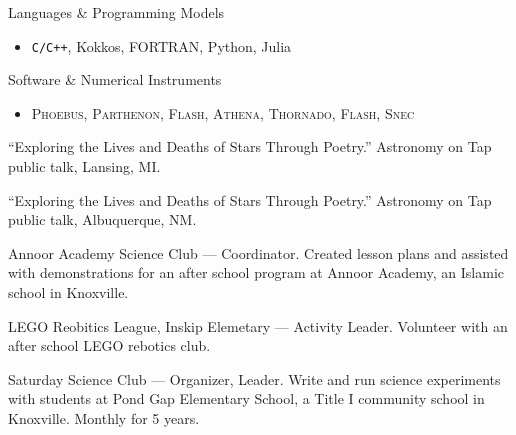 \documentclass[11pt]{vitae}
\begin{document}
\begin{genericlist}
\item[] Languages \& Programming Models
\begin{itemize}
  \item[] \texttt{C/C++}, Kokkos, FORTRAN, Python, Julia
\end{itemize}
\item[] Software \& Numerical Instruments
\begin{itemize}
 \item[] \textsc{Phoebus}, \textsc{Parthenon}, \textsc{Flash}, \textsc{Athena}, \textsc{Thornado}, \textsc{Flash}, \textsc{Snec}
\end{itemize}
\end{genericlist}

%
%
%
%


\begin{genericlist}

\item ``Exploring the Lives and Deaths of Stars Through Poetry.'' Astronomy on Tap public talk, Lansing, MI.

\item ``Exploring the Lives and Deaths of Stars Through Poetry.'' Astronomy on Tap public talk, Albuquerque, NM.

\item Annoor Academy Science Club --- Coordinator. Created lesson plans and assisted with demonstrations for an after school program at Annoor Academy, an Islamic school in Knoxville.

\item LEGO Reobitics League, Inskip Elemetary --- Activity Leader. Volunteer with an after school LEGO rebotics club.

\item Saturday Science Club --- Organizer, Leader. Write and run science experiments with students at Pond Gap Elementary School, a Title I community school in Knoxville. Monthly for 5 years.

\end{genericlist}
\end{document}
